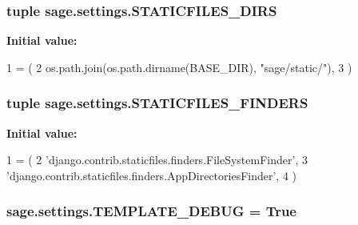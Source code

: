 \subsubsection[{S\+T\+A\+T\+I\+C\+F\+I\+L\+E\+S\+\_\+\+D\+I\+R\+S}]{\setlength{\rightskip}{0pt plus 5cm}tuple sage.\+settings.\+S\+T\+A\+T\+I\+C\+F\+I\+L\+E\+S\+\_\+\+D\+I\+R\+S}\label{namespacesage_1_1settings_ac4ae870dea0d58410747ddcbdff2b3d7}
{\bfseries Initial value\+:}
\begin{DoxyCode}
1 = (
2         os.path.join(os.path.dirname(BASE\_DIR), \textcolor{stringliteral}{"sage/static/"}),
3 )
\end{DoxyCode}
\hypertarget{namespacesage_1_1settings_af629022b1da961fa9828f450bc80bd22}{}
\subsubsection[{S\+T\+A\+T\+I\+C\+F\+I\+L\+E\+S\+\_\+\+F\+I\+N\+D\+E\+R\+S}]{\setlength{\rightskip}{0pt plus 5cm}tuple sage.\+settings.\+S\+T\+A\+T\+I\+C\+F\+I\+L\+E\+S\+\_\+\+F\+I\+N\+D\+E\+R\+S}\label{namespacesage_1_1settings_af629022b1da961fa9828f450bc80bd22}
{\bfseries Initial value\+:}
\begin{DoxyCode}
1 = (
2     \textcolor{stringliteral}{'django.contrib.staticfiles.finders.FileSystemFinder'},
3     \textcolor{stringliteral}{'django.contrib.staticfiles.finders.AppDirectoriesFinder'},
4 )
\end{DoxyCode}
\hypertarget{namespacesage_1_1settings_a74c98bee40b9b06d51e44be6df73eb46}{}
\subsubsection[{T\+E\+M\+P\+L\+A\+T\+E\+\_\+\+D\+E\+B\+U\+G}]{\setlength{\rightskip}{0pt plus 5cm}sage.\+settings.\+T\+E\+M\+P\+L\+A\+T\+E\+\_\+\+D\+E\+B\+U\+G = True}\label{namespacesage_1_1settings_a74c98bee40b9b06d51e44be6df73eb46}
\hypertarget{namespacesage_1_1settings_addc90c15790d385d304972f1b3098a86}{}
